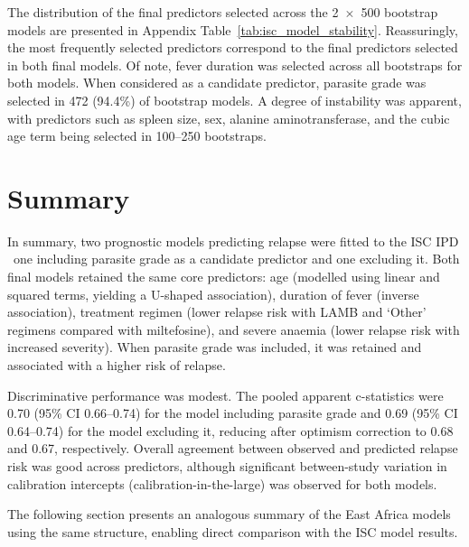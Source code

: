 The distribution of the final predictors selected across the 2~$\times$~500 bootstrap models are presented in Appendix Table~\ref{tab:isc_model_stability}. Reassuringly, the most frequently selected predictors correspond to the final predictors selected in both final models. Of note, fever duration was selected across all bootstraps for both models. When considered as a candidate predictor, parasite grade was selected in 472 (94.4\%) of bootstrap models. A degree of instability was apparent, with predictors such as spleen size, sex, alanine aminotransferase, and the cubic age term being selected in 100--250 bootstraps.

\section{Summary}

In summary, two prognostic models predicting relapse were fitted to the ISC IPD \textemdash\ one including parasite grade as a candidate predictor and one excluding it. Both final models retained the same core predictors: age (modelled using linear and squared terms, yielding a U-shaped association), duration of fever (inverse association), treatment regimen (lower relapse risk with LAMB and `Other' regimens compared with miltefosine), and severe anaemia (lower relapse risk with increased severity). When parasite grade was included, it was retained and associated with a higher risk of relapse.

Discriminative performance was modest. The pooled apparent c-statistics were 0.70 (95\% CI 0.66--0.74) for the model including parasite grade and 0.69 (95\% CI 0.64--0.74) for the model excluding it, reducing after optimism correction to 0.68 and 0.67, respectively. Overall agreement between observed and predicted relapse risk was good across predictors, although significant between-study variation in calibration intercepts (calibration-in-the-large) was observed for both models.

The following section presents an analogous summary of the East Africa models using the same structure, enabling direct comparison with the ISC model results.
